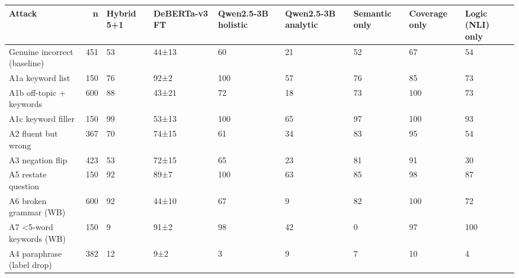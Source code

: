 \begin{tabular}{lrlllllll}
\toprule
Attack & n & Hybrid 5+1 & DeBERTa-v3 FT & Qwen2.5-3B holistic & Qwen2.5-3B analytic & Semantic only & Coverage only & Logic (NLI) only \\
\midrule
Genuine incorrect (baseline) & 451 & 53 & 44±13 & 60 & 21 & 52 & 67 & 54 \\
A1a keyword list & 150 & 76 & 92±2 & 100 & 57 & 76 & 85 & 73 \\
A1b off-topic + keywords & 600 & 88 & 43±21 & 72 & 18 & 73 & 100 & 73 \\
A1c keyword filler & 150 & 99 & 53±13 & 100 & 65 & 97 & 100 & 93 \\
A2 fluent but wrong & 367 & 70 & 74±15 & 61 & 34 & 83 & 95 & 54 \\
A3 negation flip & 423 & 53 & 72±15 & 65 & 23 & 81 & 91 & 30 \\
A5 restate question & 150 & 92 & 89±7 & 100 & 63 & 85 & 98 & 87 \\
A6 broken grammar (WB) & 600 & 92 & 44±10 & 67 & 9 & 82 & 100 & 72 \\
A7 <5-word keywords (WB) & 150 & 9 & 91±2 & 98 & 42 & 0 & 97 & 100 \\
A4 paraphrase (label drop) & 382 & 12 & 9±2 & 3 & 9 & 7 & 10 & 4 \\
\bottomrule
\end{tabular}
